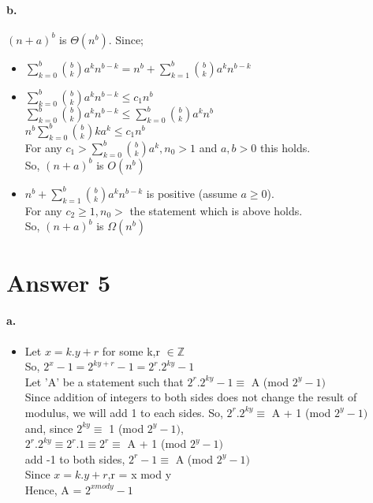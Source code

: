 \documentclass[11pt]{article}
\begin{document}
\paragraph{b.}
$(n+a)^b$ is $\Theta(n^b)$. Since;
\begin{itemize}
    \item $\sum_{k=0}^{b} \binom{b}{k} a^kn^{b-k} = n^b + \sum_{k=1}^{b} \binom{b}{k} a^kn^{b-k} $
    \item $\sum_{k=0}^{b} \binom{b}{k} a^kn^{b-k} \leq c_1n^b$\\
    $\sum_{k=0}^{b} \binom{b}{k} a^kn^{b-k} \leq \sum_{k=0}^{b} \binom{b}{k} a^kn^{b}$ \\
    $n^b \sum_{k=0}^{b} \binom{b}{k} ka^k \leq c_1n^b$ \\
    For any $c_1 > \sum_{k=0}^{b} \binom{b}{k} a^k , n_0 > 1$ and $a,b > 0$ this holds.\\
    So, $(n+a)^b$ is $O(n^b)$
    \item $n^b + \sum_{k=1}^{b} \binom{b}{k} a^kn^{b-k}$ is positive (assume $a \geq 0$). \\
    For any $c_2 \geq 1, n_0 >$ the statement which is above holds. \\
    So, $(n+a)^b$ is $\Omega(n^b)$
    
\end{itemize}

\section*{Answer 5}
\paragraph{a.}
\begin{itemize}
    \item Let $x = k.y + r$ for some k,r $\in \mathbb{Z}$ \\
So, $2^x -1 = 2^{ky + r} -1 = 2^r.2^{ky} -1 $ \\ 
Let 'A' be a statement such that $2^r.2^{ky} -1 \equiv$ A (mod $2^y -1) $ \\
Since addition of integers to both sides does not change the result of modulus, we will add 1 to each sides.
So, $2^r.2^{ky} \equiv$ A + 1 (mod $2^y -1)$ \\
and, since $2^{ky} \equiv$ 1 (mod $2^y -1)$, \\
$2^r.2^{ky} \equiv 2^r.1 \equiv 2^r \equiv$ A + 1 (mod $2^y -1)$ \\
add -1 to both sides, $2^r-1 \equiv$ A (mod $2^y -1)$ \\
Since $x = k.y + r$,r = x mod y \\
Hence, A = $2^{x mod y} - 1$
\end{itemize}
\end{document}
